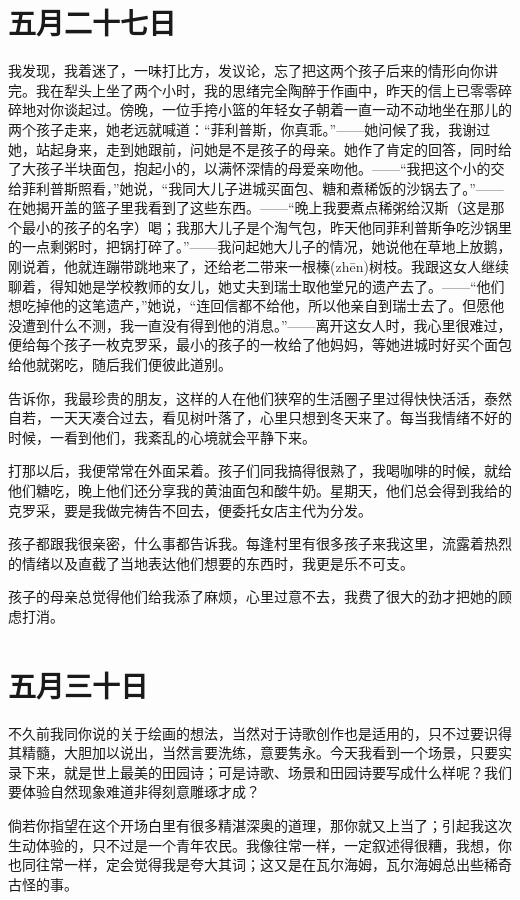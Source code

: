 \documentclass[12pt,oneside]{book}
\begin{document}
\chapter{五月二十七日}
我发现，我着迷了，一味打比方，发议论，忘了把这两个孩子后来的情形向你讲完。我在犁头上坐了两个小时，我的思绪完全陶醉于作画中，昨天的信上已零零碎碎地对你谈起过。傍晚，一位手挎小篮的年轻女子朝着一直一动不动地坐在那儿的两个孩子走来，她老远就喊道：“菲利普斯，你真乖。”——她问候了我，我谢过她，站起身来，走到她跟前，问她是不是孩子的母亲。她作了肯定的回答，同时给了大孩子半块面包，抱起小的，以满怀深情的母爱亲吻他。——“我把这个小的交给菲利普斯照看，”她说，“我同大儿子进城买面包、糖和煮稀饭的沙锅去了。”——在她揭开盖的篮子里我看到了这些东西。——“晚上我要煮点稀粥给汉斯（这是那个最小的孩子的名字）喝；我那大儿子是个淘气包，昨天他同菲利普斯争吃沙锅里的一点剩粥时，把锅打碎了。”——我问起她大儿子的情况，她说他在草地上放鹅，刚说着，他就连蹦带跳地来了，还给老二带来一根榛(zhēn)树枝。我跟这女人继续聊着，得知她是学校教师的女儿，她丈夫到瑞士取他堂兄的遗产去了。——“他们想吃掉他的这笔遗产，”她说，“连回信都不给他，所以他亲自到瑞士去了。但愿他没遭到什么不测，我一直没有得到他的消息。”——离开这女人时，我心里很难过，便给每个孩子一枚克罗采，最小的孩子的一枚给了他妈妈，等她进城时好买个面包给他就粥吃，随后我们便彼此道别。

告诉你，我最珍贵的朋友，这样的人在他们狭窄的生活圈子里过得快快活活，泰然自若，一天天凑合过去，看见树叶落了，心里只想到冬天来了。每当我情绪不好的时候，一看到他们，我紊乱的心境就会平静下来。

打那以后，我便常常在外面呆着。孩子们同我搞得很熟了，我喝咖啡的时候，就给他们糖吃，晚上他们还分享我的黄油面包和酸牛奶。星期天，他们总会得到我给的克罗采，要是我做完祷告不回去，便委托女店主代为分发。

孩子都跟我很亲密，什么事都告诉我。每逢村里有很多孩子来我这里，流露着热烈的情绪以及直截了当地表达他们想要的东西时，我更是乐不可支。

孩子的母亲总觉得他们给我添了麻烦，心里过意不去，我费了很大的劲才把她的顾虑打消。


\chapter{五月三十日}
不久前我同你说的关于绘画的想法，当然对于诗歌创作也是适用的，只不过要识得其精髓，大胆加以说出，当然言要洗练，意要隽永。今天我看到一个场景，只要实录下来，就是世上最美的田园诗；可是诗歌、场景和田园诗要写成什么样呢？我们要体验自然现象难道非得刻意雕琢才成？

倘若你指望在这个开场白里有很多精湛深奥的道理，那你就又上当了；引起我这次生动体验的，只不过是一个青年农民。我像往常一样，一定叙述得很糟，我想，你也同往常一样，定会觉得我是夸大其词；这又是在瓦尔海姆，瓦尔海姆总出些稀奇古怪的事。
\end{document}
